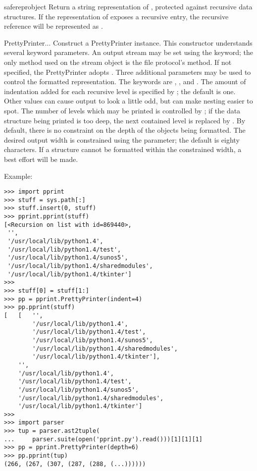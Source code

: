 \begin{funcdesc}{saferepr}{object}
Return a string representation of , protected against
recursive data structures.  If the representation of 
exposes a recursive entry, the recursive reference will be represented
as .
\end{funcdesc}



\begin{funcdesc}{PrettyPrinter}{...}
Construct a PrettyPrinter instance.  This constructor understands
several keyword parameters.  An output stream may be set using the
 keyword; the only method used on the stream object is the
file protocol's  method.  If not specified, the
PrettyPrinter adopts .  Three additional parameters
may be used to control the formatted representation.  The keywords are
, , and .  The amount of indentation
added for each recursive level is specified by ; the
default is one.  Other values can cause output to look a little odd,
but can make nesting easier to spot.  The number of levels which may
be printed is controlled by ; if the data structure being
printed is too deep, the next contained level is replaced by
.  By default, there is no constraint on the depth of the
objects being formatted.  The desired output width is constrained
using the  parameter; the default is eighty characters.  If
a structure cannot be formatted within the constrained width, a best
effort will be made.
\end{funcdesc}



Example:

\begin{verbatim}
>>> import pprint
>>> stuff = sys.path[:]
>>> stuff.insert(0, stuff)
>>> pprint.pprint(stuff)
[<Recursion on list with id=869440>,
 '',
 '/usr/local/lib/python1.4',
 '/usr/local/lib/python1.4/test',
 '/usr/local/lib/python1.4/sunos5',
 '/usr/local/lib/python1.4/sharedmodules',
 '/usr/local/lib/python1.4/tkinter']
>>> 
>>> stuff[0] = stuff[1:]
>>> pp = pprint.PrettyPrinter(indent=4)
>>> pp.pprint(stuff)
[   [   '',
        '/usr/local/lib/python1.4',
        '/usr/local/lib/python1.4/test',
        '/usr/local/lib/python1.4/sunos5',
        '/usr/local/lib/python1.4/sharedmodules',
        '/usr/local/lib/python1.4/tkinter'],
    '',
    '/usr/local/lib/python1.4',
    '/usr/local/lib/python1.4/test',
    '/usr/local/lib/python1.4/sunos5',
    '/usr/local/lib/python1.4/sharedmodules',
    '/usr/local/lib/python1.4/tkinter']
>>>
>>> import parser
>>> tup = parser.ast2tuple(
...     parser.suite(open('pprint.py').read()))[1][1][1]
>>> pp = pprint.PrettyPrinter(depth=6)
>>> pp.pprint(tup)
(266, (267, (307, (287, (288, (...))))))
\end{verbatim}


